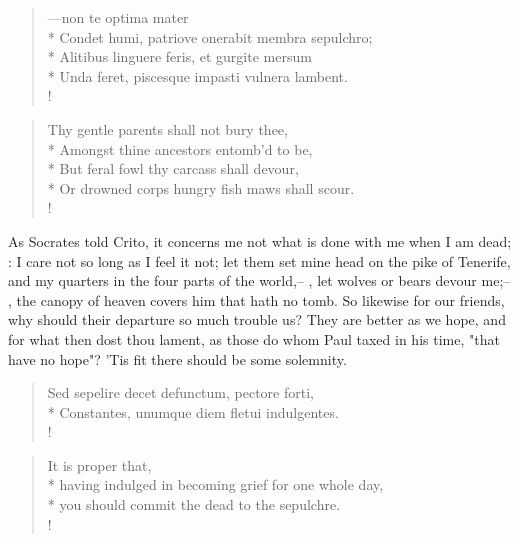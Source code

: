{\begin{latin}%
\begin{verse}%
---non te optima mater\\*
Condet humi, patriove onerabit membra sepulchro;\\*
Alitibus linguere feris, et gurgite mersum\\*
Unda feret, piscesque impasti vulnera lambent.\\!
\end{verse}%
\end{latin}%
\translationrule%
\begin{verse}%
Thy gentle parents shall not bury thee,\\*
Amongst thine ancestors entomb'd to be,\\*
But feral fowl thy carcass shall devour,\\*
Or drowned corps hungry fish maws shall scour.\\!
\end{verse}%

As Socrates told Crito, it concerns me not what is done with me when I am dead; : I care not so long as I feel it not; let them set mine head on the pike of Tenerife, and my quarters in the four parts of the world,-- , let wolves or bears devour me;-- , the canopy of heaven covers him that hath no tomb. So likewise for our friends, why should their departure so much trouble us? They are better as we hope, and for what then dost thou lament, as those do whom Paul taxed in his time,  "that have no hope"? 'Tis fit there should be some solemnity.

%
\begin{latin}%
\begin{verse}%
Sed sepelire decet defunctum, pectore forti,\\*
Constantes, unumque diem fletui indulgentes.\\!
\end{verse}%
\end{latin}%
\translationrule%
\begin{verse}%
It is proper that,\\*
having indulged in becoming grief for one whole day,\\*
you should commit the dead to the sepulchre.\\!
\end{verse}%

}
